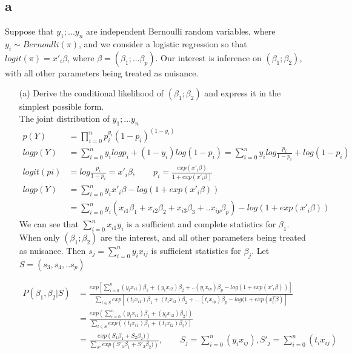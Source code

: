 \documentclass[11pt]{article} %
\begin{document}
\subsection{a}
Suppose that $y_1;... y_n$ are independent Bernoulli random variables, where $y_i  \sim Bernoulli(\pi)$, and we consider a logistic regression so that $logit(\pi) = x'_i\beta$, where $\beta = (\beta_1;... \beta_p)$. Our interest is inference on $(\beta_1; \beta_2)$, with all other parameters being treated as nuisance.
\begin{itemize}
	\item [(a)] Derive the conditional likelihood of $(\beta_1; \beta_2)$ and express it in the simplest possible form.\\
	The joint distribution of $y_1;... y_n$
	\begin{align*}
		p(Y) &= \prod_{i=0}^n p_i^{y_i} (1-p_i)^{(1-y_i)}\\
		log p(Y) &= \sum_{i=0}^n y_i log p_i + (1-y_i) log (1-p_i) = \sum_{i=0}^n y_i log \frac{p_i}{1-p_i}  + log (1-p_i) \\
		logit(pi) & = log \frac{p_i}{1-p_i} = x'_i\beta , \qquad p_i = \frac{exp(x'_i\beta )}{1+exp(x'_i\beta) } \\
		log p(Y) &= \sum_{i=0}^n y_i  x'_i\beta  - log (1+exp(x'_i\beta) ) \\
		&= \sum_{i=0}^n y_i  (x_{i1}\beta_1 + x_{i2}\beta_2 + x_{i3}\beta_3+.. x_{ip}\beta_p) - log (1+exp(x'_i\beta) ) 
	\end{align*}
	We can see that $\sum_{i=0}^n x_{i1}y_i$ is a sufficient and complete statistics for $\beta_1$. When only $(\beta_1; \beta_2)$ are the interest, and all other parameters being treated as nuisance. Then $s_j = \sum_{i=0}^n y_ix_{ij}$ is sufficient statistics for $\beta_j$. Let $S= (s_3, s_4,.. s_p)$
	
	\begin{align*}
		P(\beta_1, \beta_2| S)  &= \frac{exp \left[\sum_{i=0}^n (y_i  x_{i1})\beta_1 + (y_i  x_{i2})\beta_2 + .. (y_i  x_{ip})\beta_p - log (1+exp(x'_i\beta) ) \right]}{\sum_{t \in S} exp \left[ (t_i  x_{i1})\beta_1 + (t_i  x_{i2})\beta_2 +... (t_i  x_{ip})\beta_p - log (1+exp(x_{i}^T\beta ) \right]}  \\
		&= \frac{exp \left( \sum_{i=0}^n (y_i  x_{i1})\beta_1 + (y_i  x_{i2})\beta_2) \right)}{\sum_{t \in S} exp \left( (t_i  x_{i1})\beta_1 + (t_i  x_{i2})\beta_2)\right)}\\
		&= \frac{exp \left(S_1\beta_1 + S_2 \beta_2) \right)}{\sum_{S'} exp \left( S'_1\beta_1 + S'_2\beta_2)\right)}, \qquad S_j= \sum_{i=0}^n (y_i  x_{ij}), S'_j= \sum_{i=0}^n (t_i  x_{ij})
	\end{align*}
	

\end{itemize}
\end{document}
